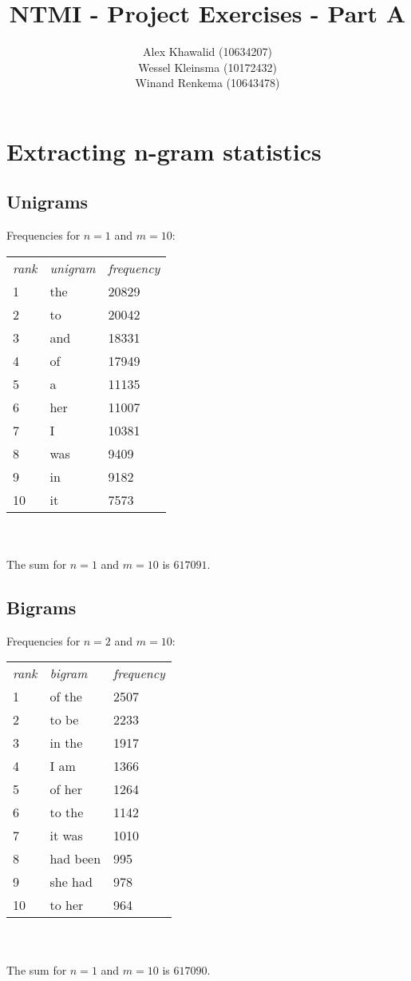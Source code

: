 \documentclass[10pt,a4paper]{article}
\title{NTMI - Project Exercises - Part A}
\author{Alex Khawalid (10634207)\\
Wessel Kleinsma (10172432)\\
Winand Renkema (10643478)\\
}
\begin{document}
\maketitle

\section{Extracting n-gram statistics}

\subsection{Unigrams}
Frequencies for $n = 1$ and $m = 10$:\\

\begin{tabular}{l l l}
\textit{rank}&	\textit{unigram}	& \textit{frequency} \\
1	&	the		& 20829 \\
2	&	to		& 20042 \\
3	&	and		& 18331\\
4	&	of		& 17949\\
5	&	a		& 11135\\
6	&	her		& 11007\\
7	&	I		& 10381\\
8	&	was		& 9409\\
9	&	in		& 9182\\
10	&	it		& 7573\\
\end{tabular}\\
\\
The sum for $n = 1$ and $m = 10$ is $617091$.

\subsection{Bigrams}
Frequencies for $n = 2$ and $m = 10$:\\

\begin{tabular}{l l l}
\textit{rank}&	\textit{bigram}	& \textit{frequency} \\
1	&	of the		&  2507	\\
2	&	to be		&  2233	\\ 
3	&	in the		&  1917	\\ 
4	&	I am		&  1366	\\ 
5	&	of her		&  1264	\\ 
6	&	to the		&  1142	\\ 
7	&	it was		&  1010	\\ 
8	&	had been	&  995	\\ 
9	&	she had		&  978	\\ 
10	&	to her		&  964	\\ 
\end{tabular}\\
\\
The sum for $n = 1$ and $m = 10$ is $617090$.
\end{document}
